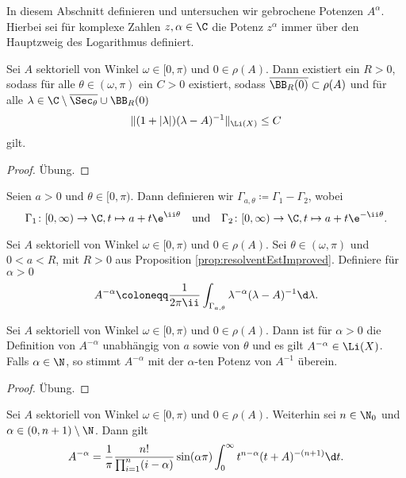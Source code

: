 In diesem Abschnitt definieren und untersuchen wir gebrochene Potenzen $A^\alpha$.
Hierbei sei für komplexe Zahlen $z,\alpha \in \C$ die Potenz $z^\alpha$ immer über den Hauptzweig des Logarithmus definiert.

\begin{prop}
  \label{prop:resolventEstImproved}
  Sei $A$ sektoriell von Winkel $\omega \in [0,\pi)$ und $0 \in \rho(A)$.
    Dann existiert ein $R > 0$, sodass für alle $\theta \in (\omega, \pi)$ ein $C > 0$ existiert, sodass $\overline{\BB_R(0)} \subset \rho(A)$ und für alle $\lambda \in \C \setminus \overline{\Sec_\theta} \cup \BB_R(0)$
    $$
    \| (1 + |\lambda| ) (\lambda - A)^{-1} \|_{\Li(X)} \leq C
    $$
    gilt.
\end{prop}

\begin{proof}
  Übung.
\end{proof}

\begin{ntion}
  Seien $a > 0$ und $\theta \in [0,\pi)$.
  Dann definieren wir $\Gamma_{a,\theta} \coloneqq \Gamma_1 - \Gamma_2$, wobei
  $$
    \Gamma_1 \colon [0,\infty) \to \C, t \mapsto a + t\e^{\ii\theta} \quad\text{und} \quad
    \Gamma_2 \colon [0,\infty) \to \C, t \mapsto a + t\e^{-\ii\theta}.
  $$
\end{ntion}

\begin{defn}
  Sei $A$ sektoriell von Winkel $\omega \in [0,\pi)$ und $0 \in \rho(A)$.
  Sei $\theta \in (\omega,\pi)$ und $0 < a < R$, mit $R > 0$ aus Proposition \ref{prop:resolventEstImproved}.
  Definiere für $\alpha > 0$
  $$
  A^{-\alpha} \coloneqq \frac{1}{2\pi \ii} \int_{\Gamma_{a,\theta}} \lambda^{-\alpha} (\lambda - A)^{-1} \d \lambda.
  $$
\end{defn}

\begin{prop}
  \label{prop:natPow}
  Sei $A$ sektoriell von Winkel $\omega \in [0,\pi)$ und $0 \in \rho(A)$.
  Dann ist für $\alpha > 0$ die Definition von $A^{-\alpha}$ unabhängig von $a$ sowie von $\theta$ und es gilt $A^{-\alpha} \in \Li(X)$. Falls $\alpha \in \N$, so stimmt $A^{-\alpha}$ mit der $\alpha$-ten Potenz von $A^{-1}$ überein.
\end{prop}

\begin{proof}
  Übung.
\end{proof}

\begin{thm}
  \label{thm:negFracPower}
  Sei $A$ sektoriell von Winkel $\omega \in [0,\pi)$ und $0 \in \rho(A)$.
  Weiterhin sei $n \in \N_0$ und $\alpha \in (0,n+1) \setminus \N$.
  Dann gilt
  $$
  A^{-\alpha} = \frac{1}{\pi} \frac{n!}{\prod_{i = 1}^n(i - \alpha)} \sin(\alpha\pi) \int_0^\infty t^{n - \alpha} ( t + A)^{-(n+1)} \d t.
  $$
\end{thm}

